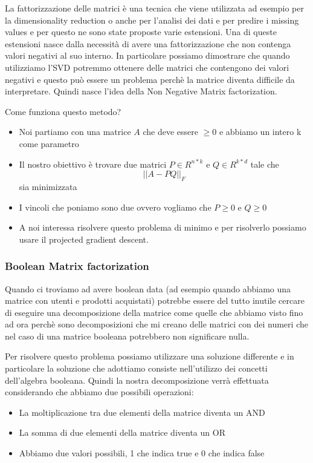 \documentclass[14pt]{extreport}
\begin{document}
La fattorizzazione delle matrici è una tecnica che viene utilizzata ad esempio per la dimensionality reduction 
o anche per l'analisi dei dati e per predire i missing values e per questo ne sono state proposte varie estensioni.
Una di queste estensioni nasce dalla necessità di avere una fattorizzazione che non contenga valori negativi al suo interno.
In particolare possiamo dimostrare che quando utilizziamo l'SVD potremmo ottenere delle matrici che contengono dei valori negativi e questo può essere un problema
perchè la matrice diventa difficile da interpretare. Quindi nasce l'idea della Non Negative Matrix factorization.

Come funziona questo metodo?

\begin{itemize}
\item Noi partiamo con una matrice $A$ che deve essere $\geq 0$ e abbiamo un intero k come parametro 
\item Il nostro obiettivo è trovare due matrici $P \in R^{n*k}$ e $Q \in R^{k*d}$ tale che $$||A - PQ||_F$$ sia minimizzata 
\item I vincoli che poniamo sono due ovvero vogliamo che $P \geq 0$ e  $Q \geq 0$
\item A noi interessa risolvere questo problema di minimo e per risolverlo possiamo usare il projected gradient descent.
\end{itemize}


\subsubsection{Boolean Matrix factorization}

Quando ci troviamo ad avere boolean data (ad esempio quando abbiamo una matrice con utenti e prodotti acquistati) potrebbe essere del tutto inutile 
cercare di eseguire una decomposizione della matrice come quelle che abbiamo visto fino ad ora perchè sono decomposizioni che mi creano delle matrici con 
dei numeri che nel caso di una matrice booleana potrebbero non significare nulla.

Per risolvere questo problema possiamo utilizzare una soluzione differente e in particolare la soluzione che adottiamo consiste nell'utilizzo dei concetti
dell'algebra booleana.
Quindi la nostra decomposizione verrà effettuata considerando che abbiamo due possibili operazioni:
\begin{itemize}
\item La moltiplicazione tra due elementi della matrice diventa un AND 
\item La somma di due elementi della matrice diventa un OR
\item Abbiamo due valori possibili, 1 che indica true e 0 che indica false
\end{itemize}
\end{document}
